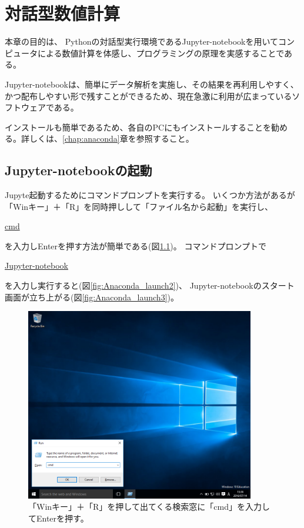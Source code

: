 \chapter{対話型数値計算}

本章の目的は、
Pythonの対話型実行環境であるJupyter-notebookを用いてコンピュータによる数値計算を体感し、プログラミングの原理を実感することである。

Jupyter-notebookは、簡単にデータ解析を実施し、その結果を再利用しやすく、かつ配布しやすい形で残すことができるため、現在急激に利用が広まっているソフトウェアである。

インストールも簡単であるため、各自のPCにもインストールすることを勧める。詳しくは、\ref{chap:anaconda}章を参照すること。

\section{Jupyter-notebookの起動}
Jupyte起動するためにコマンドプロンプトを実行する。
いくつか方法があるが「Winキー」＋「R」を同時押しして「ファイル名から起動」を実行し、

\url{cmd}

\noindent を入力しEnterを押す方法が簡単である(図\ref{fig:Anaconda_launch1})。
コマンドプロンプトで

\url{Jupyter-notebook}

\noindent を入力し実行すると(図\ref{fig:Anaconda_launch2})、
Jupyter-notebookのスタート画面が立ち上がる(図\ref{fig:Anaconda_launch3})。
　
\begin{figure}
	\centering
	\includegraphics[width=10cm]{TeX_files/fig_python_install/Anaconda_launch1.png}
	\caption{
		\label{fig:Anaconda_launch1}
		「Winキー」＋「R」を押して出てくる検索窓に「cmd」を入力してEnterを押す。
			}
\end{figure}

